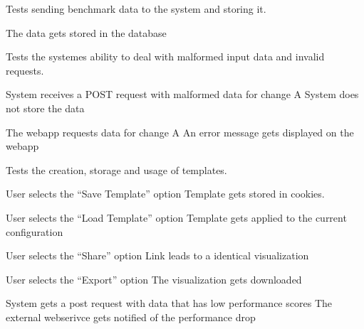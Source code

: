Tests sending benchmark data to the system and storing it.

{The data gets stored in the database}


Tests the systemes ability to deal with malformed input data and invalid requests.

{System receives a POST request with malformed data for change A}
{System does not store the data}

{The webapp requests data for change A}
{An error message gets displayed on the webapp}


Tests the creation, storage and usage of templates.

{User selects the \enquote{Save Template} option}
{Template gets stored in cookies.}

{User selects the \enquote{Load Template} option}
{Template gets applied to the current configuration}


{User selects the \enquote{Share} option}
{Link leads to a identical \gls{visualization}}


{User selects the \enquote{Export} option}
{The \gls{visualization} gets downloaded}


{System gets a post request with data that has low performance scores}
{The external webserivce gets notified of the performance drop}
